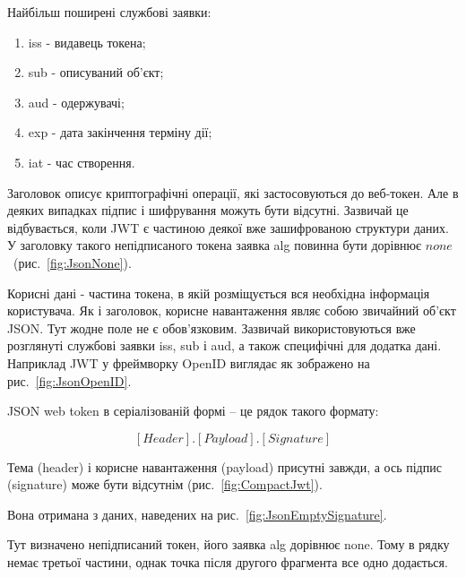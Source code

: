 Найбільш поширені службові заявки:
\begin{enumerate}
	\item iss - видавець токена;
	\item sub - описуваний об'єкт;
	\item aud - одержувачі;
	\item exp - дата закінчення терміну дії;
	\item iat - час створення.
\end{enumerate}

Заголовок описує криптографічні операції, які застосовуються до веб-токен. Але в деяких випадках підпис і шифрування можуть бути відсутні. Зазвичай це відбувається, коли JWT є частиною деякої вже зашифрованою структури даних. У заголовку такого непідписаного токена заявка alg повинна бути дорівнює $none$~(рис.~\ref{fig:JsonNone}).


Корисні дані - частина токена, в якій розміщується вся необхідна інформація користувача. Як і заголовок, корисне навантаження являє собою звичайний об'єкт JSON. Тут жодне поле не є обов'язковим. Зазвичай використовуються вже розглянуті службові заявки iss, sub і aud, а також специфічні для додатка дані. Наприклад JWT у фреймворку OpenID виглядає як зображено на рис.~\ref{fig:JsonOpenID}.


JSON web token в серіалізованій формі -- це рядок такого формату:

$$[Header].[Payload].[Signature]$$

Тема (header) і корисне навантаження (payload) присутні завжди, а ось підпис (signature) може бути відсутнім (рис.~\ref{fig:CompactJwt}).


Вона отримана з даних, наведених на рис.~\ref{fig:JsonEmptySignature}.


Тут визначено непідписаний токен, його заявка alg дорівнює none. Тому в рядку немає третьої частини, однак точка після другого фрагмента все одно додається.

